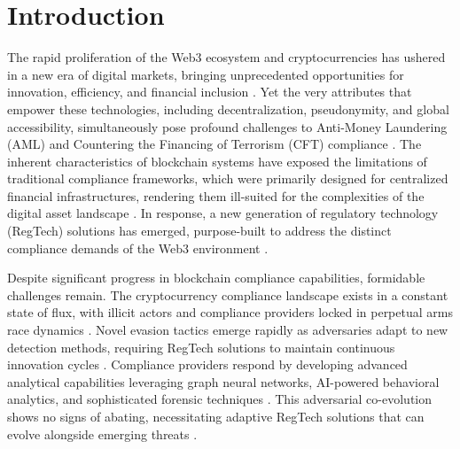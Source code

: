 \section{Introduction}

The rapid proliferation of the Web3 ecosystem and cryptocurrencies has ushered in a new era of digital markets, bringing unprecedented opportunities for innovation, efficiency, and financial inclusion \cite{bonneau2015sokresearchperspectives,voshmgir2020tokeneconomyhow,abdelhamid2025reviewblockchaintechnology}. Yet the very attributes that empower these technologies, including decentralization, pseudonymity, and global accessibility, simultaneously pose profound challenges to Anti-Money Laundering (AML) and Countering the Financing of Terrorism (CFT) compliance \cite{force2021updatedguidanceriskbased,financialactiontaskforcefatf2012internationalstandardscombating,huang2020antimoneylaunderingblockchain}. The inherent characteristics of blockchain systems have exposed the limitations of traditional compliance frameworks, which were primarily designed for centralized financial infrastructures, rendering them ill-suited for the complexities of the digital asset landscape \cite{weber2019antimoneylaunderingbitcoin,pocher2023detectinganomalouscryptocurrency,bankforinternationalsettlementsbis2022futuremonetarysystem,aldasoroapproachantimoneylaundering}. In response, a new generation of regulatory technology (RegTech) solutions has emerged, purpose-built to address the distinct compliance demands of the Web3 environment \cite{arner2016fintechregtechreconceptualization,charoenwong2024regtechtechnologydrivencompliance,prosper2025blockchainbasedsolutionsantimoney}.

Despite significant progress in blockchain compliance capabilities, formidable challenges remain. The cryptocurrency compliance landscape exists in a constant state of flux, with illicit actors and compliance providers locked in perpetual arms race dynamics \cite{albrecht2019usecryptocurrenciesmoney,guidara2022cryptocurrencymoneylaundering,prosper2025blockchainbasedsolutionsantimoney}. Novel evasion tactics emerge rapidly as adversaries adapt to new detection methods, requiring RegTech solutions to maintain continuous innovation cycles \cite{unitednationsofficeondrugsandcrimemoneylaunderingcryptocurrencies}. Compliance providers respond by developing advanced analytical capabilities leveraging graph neural networks, AI-powered behavioral analytics, and sophisticated forensic techniques \cite{azad2025machinelearningblockchain,rodriguezvalencia2025systematicreviewartificial,zebari2025comprehensivereviewintegrating}. This adversarial co-evolution shows no signs of abating, necessitating adaptive RegTech solutions that can evolve alongside emerging threats \cite{verma2024impactcryptocurrencymoney,tiwari2025understandingevolvinglandscape}.

